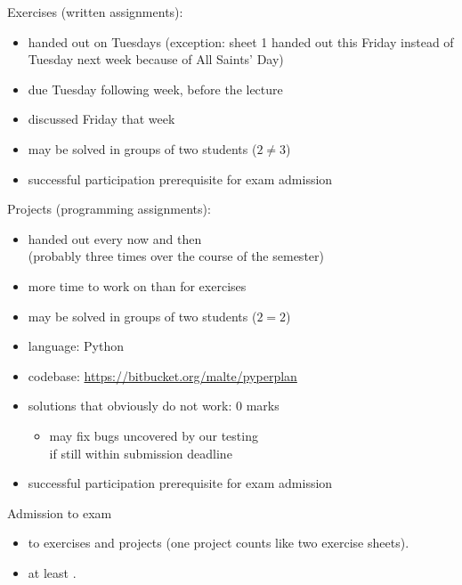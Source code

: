 \documentclass{gkibeamer}
\begin{document}
\begin{frame}{Exercises}
   (written assignments):
  \begin{itemize}
  \item handed out on Tuesdays (exception: sheet 1 handed out this
    Friday instead of Tuesday next week because of All Saints' Day)
  \item due Tuesday following week, before the lecture
  \item discussed Friday that week
  \item may be solved in groups of two students ($2 \neq 3$)
  \item successful participation prerequisite for exam
    admission
  \end{itemize}
\end{frame}

\begin{frame}{Projects}
   (programming assignments):
  \begin{itemize}
  \item handed out every now and then\\
    (probably three times over the course of the semester)
  \item more time to work on than for exercises
  \item may be solved in groups of two students ($2 = 2$)
  \item language: Python
  \item codebase: \url{https://bitbucket.org/malte/pyperplan}
  \item solutions that obviously do not work: 0 marks
    \begin{itemize}
    \item may fix bugs uncovered by our testing \\
      \alert{if still within submission deadline}
    \end{itemize}
  \item successful participation prerequisite for exam
    admission
  \end{itemize}
\end{frame}

\begin{frame}{Admission to exam}
  \begin{itemize}
  \item {} to
    exercises and projects (one project counts like two exercise
    sheets).
  \item at least .
  \end{itemize}
\end{frame}
\end{document}
